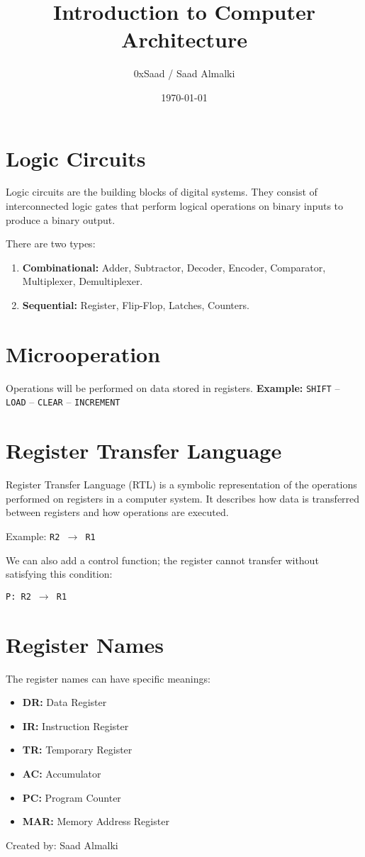 \documentclass[12pt]{article}
\title{Introduction to Computer Architecture}
\author{0xSaad / Saad Almalki}
\date{\today}
\begin{document}
\maketitle

\section{Logic Circuits}
Logic circuits are the building blocks of digital systems. They consist of interconnected logic gates that perform logical operations on binary inputs to produce a binary output.

There are two types:
\begin{enumerate}[label=\arabic*.]
    \item \textbf{Combinational:} Adder, Subtractor, Decoder, Encoder, Comparator, Multiplexer, Demultiplexer.
    \item \textbf{Sequential:} Register, Flip-Flop, Latches, Counters.
\end{enumerate}

\section{Microoperation}
Operations will be performed on data stored in registers.  
\textbf{Example:} \texttt{SHIFT} -- \texttt{LOAD} -- \texttt{CLEAR} -- \texttt{INCREMENT}

\section{Register Transfer Language}
Register Transfer Language (RTL) is a symbolic representation of the operations performed on registers in a computer system. It describes how data is transferred between registers and how operations are executed.

\vspace{0.5em}
Example: \quad \texttt{R2 $\rightarrow$ R1}

\vspace{0.5em}
We can also add a control function; the register cannot transfer without satisfying this condition:

\vspace{0.5em}
\texttt{P: R2 $\rightarrow$ R1}

\section{Register Names}
The register names can have specific meanings:
\begin{itemize}
    \item \textbf{DR:} Data Register
    \item \textbf{IR:} Instruction Register
    \item \textbf{TR:} Temporary Register
    \item \textbf{AC:} Accumulator
    \item \textbf{PC:} Program Counter
    \item \textbf{MAR:} Memory Address Register
\end{itemize}

\begin{flushright}
Created by: Saad Almalki \\
\end{flushright}
\end{document}
